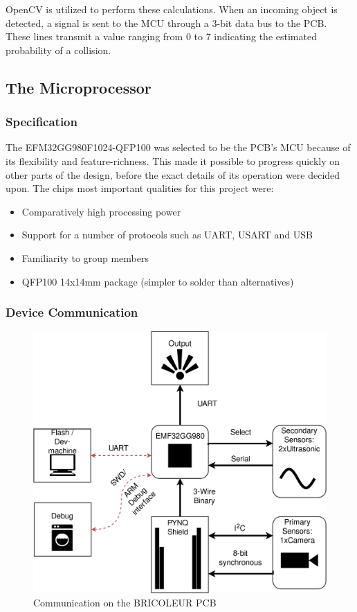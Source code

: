 OpenCV is utilized to perform these calculations. When an incoming object is detected, a signal is sent to the MCU through a 3-bit data bus to the PCB. These lines transmit a value ranging from 0 to 7 indicating the estimated probability of a collision.

\subsection{The Microprocessor}
\subsubsection{Specification} %
The EFM32GG980F1024-QFP100 was selected to be the PCB's MCU because of its flexibility and feature-richness. This made it possible to progress quickly on other parts of the design, before the exact details of its operation were decided upon. The chips most important qualities for this project were:
\begin{itemize}
    \item Comparatively high processing power
    \item Support for a number of protocols such as UART, USART and USB 
    \item Familiarity to group members
    \item QFP100 14x14mm package (simpler to solder than alternatives) %
\end{itemize}

\subsubsection{Device Communication}
\begin{figure}[h!]
    \centering
    \includegraphics[scale=0.12]{Images/PCB(7).png}
    \caption{Communication on the BRICOLEUR PCB}
    \label{fig:PCB_COMM}
\end{figure}

